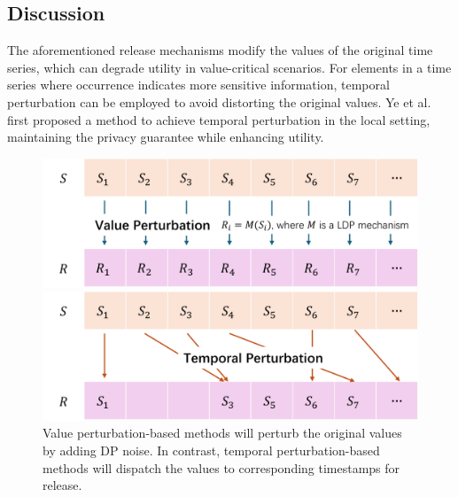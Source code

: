 \subsection{Discussion}
The aforementioned release mechanisms modify the values of the original time series, which can degrade utility in value-critical scenarios. For elements in a time series where occurrence indicates more sensitive information, temporal perturbation can be employed to avoid distorting the original values. Ye et al.~\cite{ye2021beyond} first proposed a method to achieve temporal perturbation in the local setting, maintaining the privacy guarantee while enhancing utility.
\begin{figure}[htbp]
	\centering
	\begin{minipage}{0.4\textwidth}
		\centering
		\includegraphics[width=\linewidth]{submissions/submission4/figs/05-release/value_perturbation-crop.pdf}
	\end{minipage}\hspace{0.55in}
	\begin{minipage}{0.4\textwidth}
		\centering
		\includegraphics[width=\linewidth]{submissions/submission4/figs/05-release/temporal_perturbation-crop.pdf}
	\end{minipage}
	\caption{Value perturbation-based methods will perturb the original values by adding DP noise. In contrast, temporal perturbation-based methods will dispatch the values to corresponding timestamps for release.}
	\label{vptp}
\end{figure}
